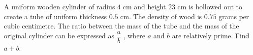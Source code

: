A uniform wooden cylinder of radius $4$ cm and height $23$ cm is hollowed out to create a tube of uniform thickness $0.5$ cm. The density of wood is $0.75$ grams per cubic centimetre. The ratio between the mass of the tube and the mass of the original cylinder can be expressed as $\dfrac{a}{b}$ , where $a$ and $b$ are relatively prime. Find $a + b$.

